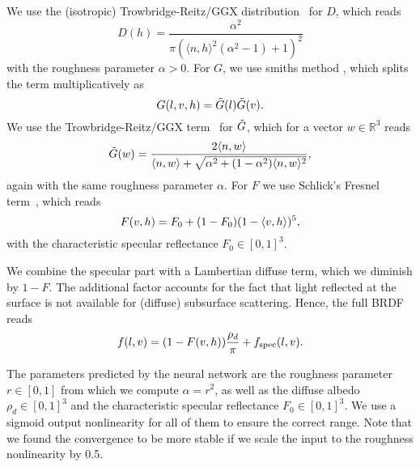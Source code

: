 We use the (isotropic) Trowbridge-Reitz/GGX distribution~\cite{smith1967geometrical, walter2007microfacet, trowbridge1975average} for $D$, which reads 
\begin{equation}
    D(h) = \frac{\alpha^2}{\pi(\langle n, h\rangle^2(\alpha^2 - 1) + 1)^2}
\end{equation}
with the roughness parameter $\alpha>0$.
For $G$, we use smiths method \cite{smith1967geometrical}, which splits the term multiplicatively as
\begin{equation}
    G(l, v, h) = \Tilde{G}(l)\Tilde{G}(v).
\end{equation}
We use the Trowbridge-Reitz/GGX term~\cite{smith1967geometrical, walter2007microfacet, trowbridge1975average} for $\Tilde{G}$, which for a vector $w\in\mathbb{R}^3$ reads
\begin{equation}
    \Tilde{G}(w) = \frac{2\langle n, w\rangle}{\langle n, w\rangle + \sqrt{\alpha^2 + (1-\alpha^2)\langle n, w\rangle^2}},
\end{equation}
again with the same roughness parameter $\alpha$.
For $F$ we use Schlick's Fresnel term~\cite{schlick1994inexpensive}, which reads
\begin{equation}
    F(v, h) = F_0 + (1-F_0)(1-\langle v, h\rangle)^5,
\end{equation}
with the characteristic specular reflectance $F_0\in[0, 1]^3$.

We combine the specular part with a Lambertian diffuse term, which we diminish by $1-F$. The additional factor accounts for the fact that light reflected at the surface is not available for (diffuse) subsurface scattering. Hence, the full BRDF reads
\begin{equation}
     f(l, v) = (1- F(v, h))\frac{\rho_d}{\pi} +  f_\mathrm{spec}(l, v).
\end{equation}

The parameters predicted by the neural network are the roughness parameter $r\in[0,1]$ from which we compute $\alpha = r^2$, as well as the diffuse albedo $\rho_d\in[0, 1]^3$ and the characteristic specular reflectance $F_0\in[0, 1]^3$. We use a sigmoid output nonlinearity for all of them to ensure the correct range. Note that we found the convergence to be more stable if we scale the input to the roughness nonlinearity by 0.5.

